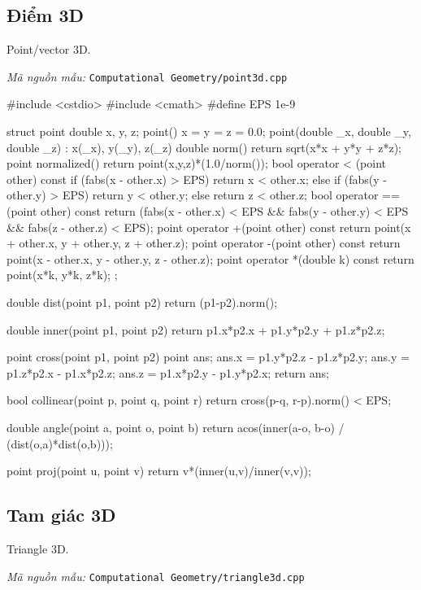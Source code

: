 \documentclass[11pt]{article}
\newcommand{\codepath}[1]{\par\noindent\textit{Mã nguồn mẫu:} \texttt{#1}\par}
\begin{document}
\subsection{Điểm 3D}

Point/vector 3D.

\codepath{Computational Geometry/point3d.cpp}

\begingroup\scriptsize
\begin{vncode}
#include <cstdio>
#include <cmath>
#define EPS 1e-9

struct point {
	double x, y, z;
	point() { x = y = z = 0.0; }
	point(double _x, double _y, double _z) : x(_x), y(_y), z(_z) {}
	double norm() {
		return sqrt(x*x + y*y + z*z);
	}
	point normalized() {
		return point(x,y,z)*(1.0/norm());
	}
	bool operator < (point other) const {
		if (fabs(x - other.x) > EPS) return x < other.x;
		else if (fabs(y - other.y) > EPS) return y < other.y;
		else return z < other.z;
	}
	bool operator == (point other) const {
		return (fabs(x - other.x) < EPS && fabs(y - other.y) < EPS && fabs(z - other.z) < EPS);
	}
	point operator +(point other) const{
		return point(x + other.x, y + other.y, z + other.z);
	}
	point operator -(point other) const{
		return point(x - other.x, y - other.y, z - other.z);
	}
	point operator *(double k) const{
		return point(x*k, y*k, z*k);
	}
};

double dist(point p1, point p2) {
	return (p1-p2).norm();
}

double inner(point p1, point p2) {
	return p1.x*p2.x + p1.y*p2.y + p1.z*p2.z;
}

point cross(point p1, point p2) {
	point ans;
	ans.x = p1.y*p2.z - p1.z*p2.y;
	ans.y = p1.z*p2.x - p1.x*p2.z;
	ans.z = p1.x*p2.y - p1.y*p2.x;
	return ans;
}

bool collinear(point p, point q, point r) {
	return cross(p-q, r-p).norm() < EPS;
}

double angle(point a, point o, point b) {
	return acos(inner(a-o, b-o) / (dist(o,a)*dist(o,b)));
}

point proj(point u, point v) {
	return v*(inner(u,v)/inner(v,v));
}
\end{vncode}
\endgroup


\subsection{Tam giác 3D}

Triangle 3D.

\codepath{Computational Geometry/triangle3d.cpp}
\end{document}
